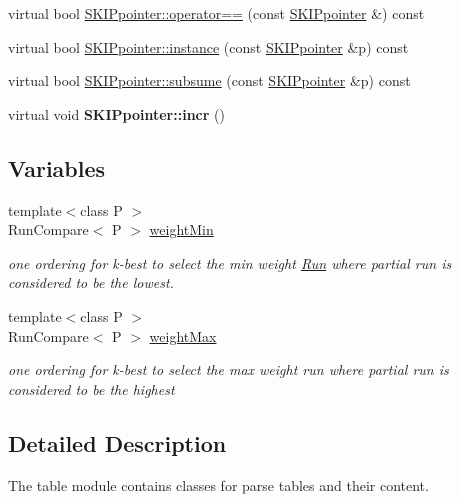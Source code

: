 \begin{DoxyCompactItemize}
\item 
virtual bool \mbox{\hyperlink{group__table_ga4ecc91594489358cf7abdbf8cfd245a4}{S\+K\+I\+Ppointer\+::operator==}} (const \mbox{\hyperlink{classSKIPpointer}{S\+K\+I\+Ppointer}} \&) const
\item 
virtual bool \mbox{\hyperlink{group__table_gaa9ccc9cf48974dca2a09ca4aa6092d43}{S\+K\+I\+Ppointer\+::instance}} (const \mbox{\hyperlink{classSKIPpointer}{S\+K\+I\+Ppointer}} \&p) const
\item 
virtual bool \mbox{\hyperlink{group__table_gaacf829ba5696414bdcc753e97e76a7f1}{S\+K\+I\+Ppointer\+::subsume}} (const \mbox{\hyperlink{classSKIPpointer}{S\+K\+I\+Ppointer}} \&p) const
\item 
\mbox{\label{group__table_gac0c72ab0a91e652b38eb815206b0baa4}} 
virtual void {\bfseries S\+K\+I\+Ppointer\+::incr} ()
\end{DoxyCompactItemize}
\subsection*{Variables}
\begin{DoxyCompactItemize}
\item 
{\footnotesize template$<$class P $>$ }\\Run\+Compare$<$ P $>$ \mbox{\hyperlink{group__table_gac5d18d8c7a8e65bf58d4bc2446202f4f}{weight\+Min}}
\begin{DoxyCompactList}\small\item\em one ordering for k-\/best to select the min weight \mbox{\hyperlink{classRun}{Run}} where partial run is considered to be the lowest. \end{DoxyCompactList}\item 
{\footnotesize template$<$class P $>$ }\\Run\+Compare$<$ P $>$ \mbox{\hyperlink{group__table_ga27170c8c3df71e6854ca3becc034ea09}{weight\+Max}}
\begin{DoxyCompactList}\small\item\em one ordering for k-\/best to select the max weight run where partial run is considered to be the highest \end{DoxyCompactList}\end{DoxyCompactItemize}


\subsection{Detailed Description}
The {\ttfamily table} module contains classes for parse tables and their content. 



